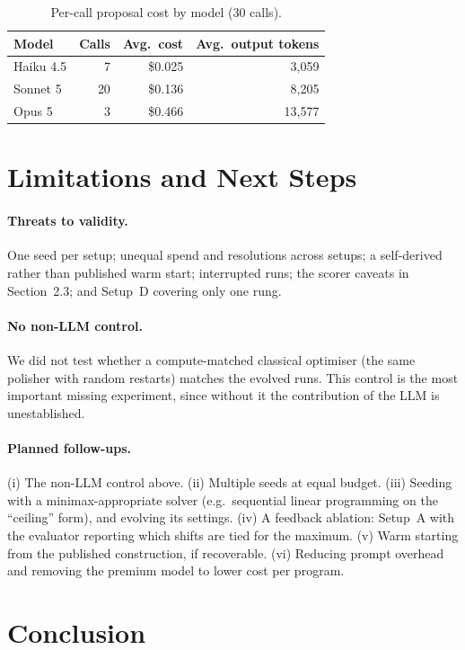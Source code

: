 \documentclass[11pt]{article}
\begin{document}
\begin{table}[h]
\centering
\caption{Per-call proposal cost by model (30 calls).}
\label{tab:cost}
\small
\begin{tabular}{lrrr}
\toprule
Model & Calls & Avg.\ cost & Avg.\ output tokens \\
\midrule
Haiku 4.5 & 7 & \$0.025 & 3{,}059 \\
Sonnet 5 & 20 & \$0.136 & 8{,}205 \\
Opus 5 & 3 & \$0.466 & 13{,}577 \\
\bottomrule
\end{tabular}
\end{table}

\section{Limitations and Next Steps}

\paragraph{Threats to validity.}
One seed per setup; unequal spend and resolutions across setups; a self-derived
rather than published warm start; interrupted runs; the scorer caveats in
Section~2.3; and Setup~D covering only one rung.

\paragraph{No non-LLM control.}
We did not test whether a compute-matched classical optimiser (the same
polisher with random restarts) matches the evolved runs. This control is the
most important missing experiment, since without it the contribution of the
LLM is unestablished.

\paragraph{Planned follow-ups.}
(i) The non-LLM control above. (ii) Multiple seeds at equal budget.
(iii) Seeding with a minimax-appropriate solver (e.g.\ sequential linear
programming on the ``ceiling'' form), and evolving its settings.
(iv) A feedback ablation: Setup~A with the evaluator reporting which shifts
are tied for the maximum. (v) Warm starting from the published construction,
if recoverable. (vi) Reducing prompt overhead and removing the premium model
to lower cost per program.

\section{Conclusion}
\end{document}
